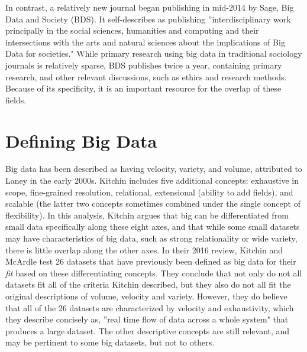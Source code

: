 \documentclass[sigconf]{acmart}
\begin{document}
In contrast, a relatively new journal began publishing in mid-2014 by Sage, Big Data and Society (BDS).  It self-describes as publishing ''interdisciplinary work principally in the social sciences, humanities and computing and their intersections with the arts and natural sciences about the implications of Big Data for societies."  While primary research using big data in traditional sociology journals is relatively sparse, BDS publishes twice a year, containing primary research, and other relevant discussions, such as ethics and research methods.  Because of its specificity, it is an important resource for the overlap of these fields.

\section{Defining Big Data}
Big data has been described as having velocity, variety, and volume, attributed to Laney in the early 2000s.\cite{japec15}  Kitchin includes five additional concepts: exhaustive in scope, fine-grained resolution, relational, extensional (ability to add fields), and scalable (the latter two concepts sometimes combined under the single concept of flexibility).\cite{kitchin14}  In this analysis, Kitchin argues that big can be differentiated from small data specifically along these eight axes, and that while some small datasets may have characteristics of big data, such as strong relationality or wide variety, there is little overlap along the other axes.   In their 2016 review, Kitchin and McArdle test 26 datasets that have previously been defined as big data for their {\em fit} based on these differentiating concepts.\cite{kitchin16}  They conclude that not only do not all datasets fit all of the criteria Kitchin described, but they also do not all fit the original descriptions of volume, velocity and variety.  However, they do believe that all of the 26 datasets are characterized by velocity and exhaustivity, which they describe concisely as, ''real time flow of data across a whole system" that produces a large dataset.  The other descriptive concepts are still relevant, and may be pertinent to some big datasets, but not to others.
\end{document}
